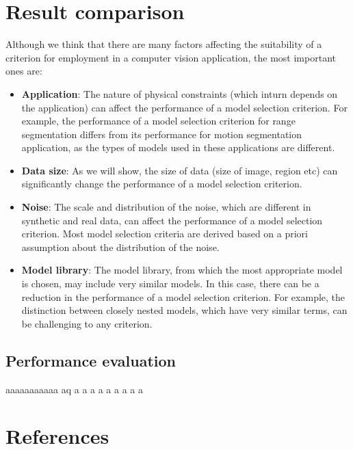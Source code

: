 \documentclass[12pt]{article}
\begin{document}
\section{Result comparison}
\label{sec:rescomp}
Although we think that there are many factors affecting the suitability of a criterion for employment in a computer vision application, the most important ones are:
\begin{itemize}
\item \textbf{Application}:  The nature of physical constraints (which inturn depends on the application) can affect the performance of a model selection criterion. For example, the performance of a model selection criterion for range segmentation differs from its performance for motion segmentation application, as the types of models used in these applications are different.

\item \textbf{Data size}: As we will show, the size of data (size of image, region etc) can significantly change the performance of a model selection criterion.

\item \textbf{Noise}: The scale and distribution of the noise, which are different in synthetic and real data, can affect the performance of a model selection criterion. Most model selection criteria are derived based on a priori assumption about the distribution of the noise.


\item \textbf{Model library}:  The model library, from which the most appropriate model is chosen, may include very similar models. In this case, there can be a reduction in the performance of a model selection criterion. For example, the distinction between closely nested models, which have very similar terms, can be challenging to any criterion.

\end{itemize}

\subsection{Performance evaluation}
aaaaaaaaaaa aq a a a a a a a a a 

\section{References}
\end{document}
